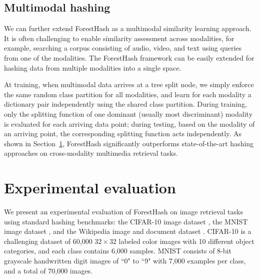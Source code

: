 \documentclass[runningheads]{llncs}
\begin{document}
\subsection{Multimodal hashing}
We can further extend ForestHash as a multimodal similarity learning approach.  It
is often challenging to enable similarity assessment across modalities, for
example, searching a corpus consisting of audio, video, and text using queries
from one of the modalities.  The ForestHash framework can be easily extended for
hashing data from multiple modalities into a single space.

At training, when multimodal data arrives at a tree split node, we simply
enforce the same random class partition for all modalities, and learn for each
modality a dictionary pair independently using the shared class partition.
During training, only the splitting function of one dominant (usually most
discriminant) modality is evaluated for each arriving data point; during
testing, based on the modality of an arriving point, the corresponding splitting
function acts independently.  As shown in Section~\ref{sec:exp}, ForestHash
significantly outperforms state-of-the-art hashing approaches on cross-modality
multimedia retrieval tasks.

            
\section{Experimental evaluation}
\label{sec:exp}

We present an experimental evaluation of ForestHash on image retrieval tasks
using standard hashing benchmarks: the {CIFAR-10} image dataset \cite{cifar10},
the {MNIST} image dataset \cite{MNIST}, and the Wikipedia image and document
dataset \cite{wikixmod}.  {CIFAR-10} is a challenging dataset of 60,000
$32\times32$ labeled color images with 10 different object categories, and each
class contains 6,000 samples.  {MNIST} consists of 8-bit grayscale handwritten
digit images of ``0" to ``9" with 7,000 examples per class, and a total of 70,000
images.
\end{document}
